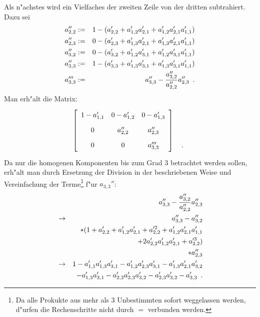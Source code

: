 Als n"achstes wird ein Vielfaches der zweiten Zeile von der dritten
subtrahiert. Dazu sei
\begin{eqnarray*}
    a_{2,2}'' & := &
        1 - (a_{2,2}' + a_{1,2}'a_{2,1}' + a_{1,2}'a_{2,1}'a_{1,1}') \\
    a_{2,3}'' & := &   
        0 - (a_{2,3}'  + a_{1,3}'a_{2,1}' + a_{1,3}'a_{2,1}'a_{1,1}') \\
    a_{3,2}'' & := &
        0 - (a_{3,2}' + a_{1,2}'a_{3,1}' + a_{1,2}'a_{3,1}'a_{1,1}') \\
    a_{3,3}'' & := &
        1 - (a_{3,3}' + a_{1,3}'a_{3,1}' + a_{1,3}'a_{3,1}'a_{1,1}') \\
    a_{3,3}''' & := &
        a_{3,3}'' - \frac{ a_{3,2}'' }{ a_{2,2}'' } a_{2,3}'' 
        \mbox{\hspace{0.5em}.}
\end{eqnarray*}
Man erh"alt die Matrix:
\[
    \left[
        \begin{array}{ccc}
            1 - a_{1,1}'
        &   0 - a_{1,2}'
        &   0 - a_{1,3}' \MatStrut
        \\     0
        &   a_{2,2}''
        &   a_{2,3}'' \MatStrut
        \\     0
        &      0
        &   a_{3,3}''' \MatStrut
        \end{array}
    \right]
    \begin{array}{c}
        \MatStrut \\ \MatStrut \\ \MyPunkt \MatStrut
    \end{array}
\]
Da nur die homogenen Komponenten bis zum Grad $3$ betrachtet werden sollen,
erh"alt man durch Ersetzung der Division in der beschriebenen Weise und
Vereinfachung der Terme\footnote{Da alle Prokukte aus mehr als $3$ 
Unbestimmten sofort weggelassen werden, d"urfen die Rechenschritte nicht
durch $=$ verbunden werden.} f"ur $a_{3,3}''$:
\begin{eqnarray*} %
    & & a_{3,3}'' - \frac{ a_{3,2}'' }{ a_{2,2}'' } a_{2,3}'' \\
    & \rightarrow &
        a_{3,3}'' - a_{3,2}'' \\
    & & * (1 + a_{2,2}' + a_{1,2}'a_{2,1}' + a_{2,2}'^2 + a_{1,2}'a_{2,1}'a_{1,1}' \\
    & & \: \: + 2 a_{2,2}'a_{1,2}'a_{2,1}' + a_{2,2}'^3) \\
    & & * a_{2,3}'' \\
    & \rightarrow &
        1 - a_{1,1}'a_{1,3}'a_{3,1}' - a_{1,2}'a_{2,3}'a_{3,1}'
        - a_{1,3}'a_{2,1}'a_{3,2}' \\
    & & - a_{1,3}'a_{3,1}' - a_{2,2}'a_{2,3}'a_{3,2}'
        - a_{2,3}'a_{3,2}' - a_{3,3}' \MyPunkt
\end{eqnarray*}
